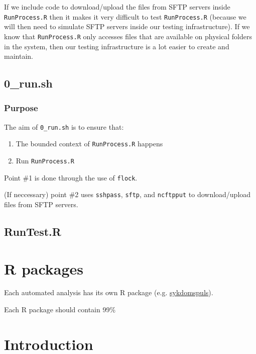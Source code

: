 \documentclass[12pt,]{article}
\providecommand{\tightlist}{%
  \setlength{\itemsep}{0pt}\setlength{\parskip}{0pt}}
\begin{document}
If we include code to download/upload the files from SFTP servers inside
\texttt{RunProcess.R} then it makes it very difficult to test
\texttt{RunProcess.R} (because we will then need to simulate SFTP
servers inside our testing infrastructure). If we know that
\texttt{RunProcess.R} only accesses files that are available on physical
folders in the system, then our testing infrastructure is a lot easier
to create and maintain.

\subsection{0\_run.sh}\label{run.sh}

\subsubsection{Purpose}\label{purpose-1}

The aim of \texttt{0\_run.sh} is to ensure that:

\begin{enumerate}
\def\labelenumi{\arabic{enumi}.}
\tightlist
\item
  The bounded context of \texttt{RunProcess.R} happens
\item
  Run \texttt{RunProcess.R}
\end{enumerate}

Point \#1 is done through the use of \texttt{flock}.

(If neccessary) point \#2 uses \texttt{sshpass}, \texttt{sftp}, and
\texttt{ncftpput} to download/upload files from SFTP servers.

\subsection{RunTest.R}\label{runtest.r}

\section{R packages}\label{r-packages}

Each automated analysis has its own R package (e.g.
\href{https://github.com/folkehelseinstituttet/dashboards_sykdomspuls/}{sykdomspuls}).

Each R package should contain 99\%

\section{Introduction}\label{intro}
\end{document}
